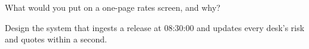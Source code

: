 \begin{interviewq}\label{iq:m2:reading-a-macro-calendar-and-a-rates-screen:5}
What would you put on a one-page rates screen, and why?
\end{interviewq}

\begin{interviewq}\label{iq:m2:reading-a-macro-calendar-and-a-rates-screen:6}
Design the system that ingests a release at 08:30:00 and updates every desk's risk and
quotes within a second.
\end{interviewq}
